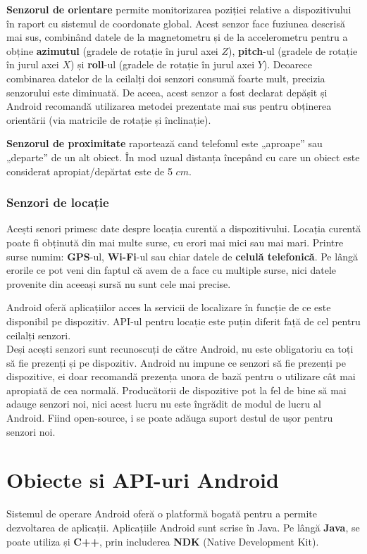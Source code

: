 \documentclass[12pt, a4paper, oneside]{article}
\begin{document}
\textbf{Senzorul de orientare} permite monitorizarea poziției relative a dispozitivului în raport cu sistemul de coordonate global. Acest senzor face fuziunea descrisă mai sus, combinând datele de la magnetometru și de la accelerometru pentru a obține \textbf{azimutul} (gradele de rotație în jurul axei $Z$), \textbf{pitch}-ul (gradele de rotație în jurul axei $X$) și \textbf{roll}-ul (gradele de rotație în jurul axei $Y$). Deoarece combinarea datelor de la ceilalți doi senzori consumă foarte mult, precizia senzorului este diminuată. De aceea, acest senzor a fost declarat depășit și Android recomandă utilizarea metodei prezentate mai sus pentru obținerea orientării (via matricile de rotație și înclinație).

\textbf{Senzorul de proximitate} raportează cand telefonul este „aproape” sau „departe” de un alt obiect. În mod uzual distanța începând cu care un obiect este considerat apropiat/depărtat este de 5 $cm$.

\subsubsection{Senzori de locație}
Acești senori primesc date despre locația curentă a dispozitivului. Locația curentă poate fi obținută din mai multe surse, cu erori mai mici sau mai mari. Printre surse numim: \textbf{GPS}-ul, \textbf{Wi-Fi}-ul sau chiar datele de \textbf{celulă telefonică}. Pe lângă erorile ce pot veni din faptul că avem de a face cu multiple surse, nici datele provenite din aceeași sursă nu sunt cele mai precise.

Android oferă aplicațiilor acces la servicii de localizare în funcție de ce este disponibil pe dispozitiv. API-ul pentru locație este puțin diferit față de cel pentru ceilalți senzori.\\

Deși acești senzori sunt recunoscuți de către Android, nu este obligatoriu ca toți să fie prezenți și pe dispozitiv. Android nu impune ce senzori să fie prezenți pe dispozitive, ei doar recomandă prezența unora de bază pentru o utilizare cât mai apropiată de cea normală. Producătorii de dispozitive pot la fel de bine să mai adauge senzori noi, nici acest lucru nu este îngrădit de modul de lucru al Android. Fiind open-source, i se poate adăuga suport destul de ușor pentru senzori noi.

\newpage

\section{Obiecte si API-uri Android} \label{ObiecteAndroid}
Sistemul de operare Android oferă o platformă bogată pentru a permite dezvoltarea de aplicații. Aplicațiile Android sunt scrise în Java. Pe lângă \textbf{Java}, se poate utiliza și \textbf{C++}, prin includerea \textbf{NDK} (Native Development Kit).
\end{document}
